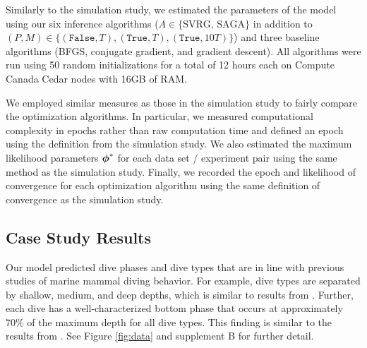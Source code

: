 %
%
Similarly to the simulation study, we estimated the parameters of the model using our six inference algorithms ($A \in \{\text{SVRG, SAGA}\}$ in addition to $(P,M) \in \{(\texttt{False},T), (\texttt{True},T), (\texttt{True},10T)\}$) and three baseline algorithms (BFGS, conjugate gradient, and gradient descent). All algorithms were run using 50 random initializations for a total of 12 hours each on Compute Canada Cedar nodes with 16GB of RAM.

We employed similar measures as those in the simulation study to fairly compare the optimization algorithms. In particular, we measured computational complexity in epochs rather than raw computation time and defined an epoch using the definition from the simulation study. We also estimated the maximum likelihood parameters $\boldsymbol{\phi}^*$ for each data set / experiment pair using the same method as the simulation study. Finally, we recorded the epoch and likelihood of convergence for each optimization algorithm using the same definition of convergence as the simulation study.

\subsection{Case Study Results}

Our model predicted dive phases and dive types that are in line with previous studies of marine mammal diving behavior. For example, dive types are separated by shallow, medium, and deep depths, which is similar to results from \citet{Barajas:2017}. Further, each dive has a well-characterized bottom phase that occurs at approximately 70\% of the maximum depth for all dive types. This finding is similar to the results from \citet{Tennessen:2019a}. See Figure \ref{fig:data} and supplement B for further detail.

